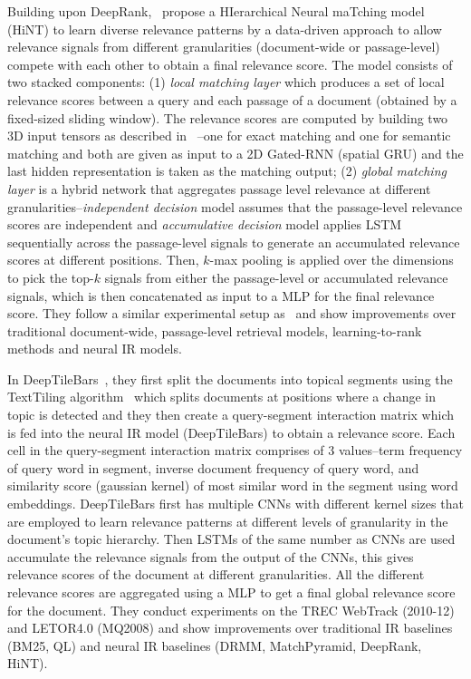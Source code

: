 Building upon DeepRank,~\cite{Fan_hint_2018} propose a \textsf{HIerarchical Neural maTching model} (HiNT) to learn diverse relevance patterns by a data-driven approach to allow relevance signals from different granularities (document-wide or passage-level) compete with each other to obtain a final relevance score. The model consists of two stacked components: (1) \textit{local matching layer} which produces a set of local relevance scores between a query and each passage of a document (obtained by a fixed-sized sliding window). The relevance scores are computed by building two 3D input tensors as described in ~\cite{Pang_deeprank_2017}--one for exact matching and one for semantic matching and both are given as input to a 2D Gated-RNN (spatial GRU) and the last hidden representation is taken as the matching output; (2) \textit{global matching layer} is a hybrid network that aggregates passage level relevance at different granularities--\textit{independent decision} model assumes that the passage-level relevance scores are independent and \textit{accumulative decision} model applies LSTM sequentially across the passage-level signals to generate an accumulated relevance scores at different positions. Then, $k$-max pooling is applied over the dimensions to pick the top-$k$ signals from either the passage-level or accumulated relevance signals, which is then concatenated as input to a MLP for the final relevance score. They follow a similar experimental setup as~\cite{Pang_deeprank_2017} and show improvements over traditional document-wide, passage-level retrieval models, learning-to-rank methods and neural IR models. 

In \textsf{DeepTileBars}~\citep{deeptilebars_2019}, they first split the documents into topical segments using the TextTiling algorithm~\citep{Hearst_text_tiling_94} which splits documents at positions where a change in topic is detected and they then create a query-segment interaction matrix which is fed into the neural IR  model (DeepTileBars) to obtain a relevance score. Each cell in the query-segment interaction matrix comprises of 3 values--term frequency of query word in segment, inverse document frequency of query word, and similarity score (gaussian kernel) of most similar word in the segment using word embeddings. DeepTileBars first has multiple CNNs with different kernel sizes that are employed to learn relevance patterns at different levels of granularity in the document's topic hierarchy. Then LSTMs of the same number as CNNs are used accumulate the relevance signals from the output of the CNNs, this gives relevance scores of the document at different granularities. All the different relevance scores are aggregated using a MLP to get a final global relevance score for the document. They conduct experiments on the TREC WebTrack (2010-12) and LETOR4.0 (MQ2008) and show improvements over traditional IR baselines (BM25, QL) and neural IR baselines (DRMM, MatchPyramid, DeepRank, HiNT).

